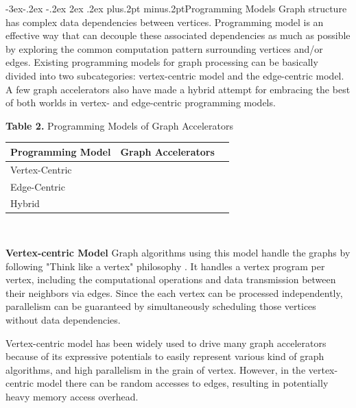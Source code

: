 \documentclass[twoside]{article}
\makeatletter
\def\subsection{\@startsection{subsection}{2}{\z@}%
 {-3ex\@plus -.2ex \@minus -.2ex}%
 {2ex \@plus.2ex}%
{\normalfont\normalsize\protect\baselineskip=12.5pt plus.2pt minus.2pt\bfseries}}
\makeatother
\begin{document}
\begin{multicols}{2}
\subsection{Programming Models}
Graph structure has complex data dependencies between vertices. Programming model is an effective way that can decouple these associated dependencies as much as possible by exploring the common computation pattern surrounding vertices and/or edges. Existing programming models for graph processing can be basically divided into two subcategories: vertex-centric model and the edge-centric model. A few graph accelerators also have made a hybrid attempt for embracing the best of both worlds in vertex- and edge-centric programming models.

\tabcolsep 12pt
\renewcommand\arraystretch{1.3}
\begin{center}
{\footnotesize{\bf Table 2.} Programming Models of Graph Accelerators}\\
\vspace{2mm}
\footnotesize{
\begin{tabular*}{\linewidth}{lp{4cm}p{4cm}}\hline\hline\hline
Programming Model & Graph Accelerators
\\\hline
Vertex-Centric & {\cite{1,2,4,5,6,7,8,9,10,12,15,16,17,18,19,20,21,22,25,26,27,32,33,36,37,40,41}} \\
Edge-Centric &  {\cite{10,13,23,24,28,29,30,38,39}} \\
Hybrid & {\cite{34}} 
\\\hline\hline\hline
\end{tabular*}%
\\\vspace{1mm}\parbox{8.3cm}{}
}
\end{center}

\vspace{1mm}

{\bf Vertex-centric Model} Graph algorithms using this model handle the graphs by following "Think like a vertex" philosophy  \cite{Malewicz2010pregel,bu2014pregelix}. It handles a vertex program per vertex, including the computational operations and data transmission between their neighbors via edges. Since the each vertex can be processed independently, parallelism can be guaranteed by simultaneously scheduling those vertices without data dependencies.

Vertex-centric model has been widely used to drive many graph accelerators \cite{nurvitadhi2014graphgen,ozdal2016energy,ham2016graphicionado,Dai2016fpgp} because of its expressive potentials to easily represent various kind of graph algorithms, and high parallelism in the grain of vertex. However, in the vertex-centric model there can be random accesses to edges, resulting in potentially heavy memory access overhead. %



\end{multicols}
\end{document}
